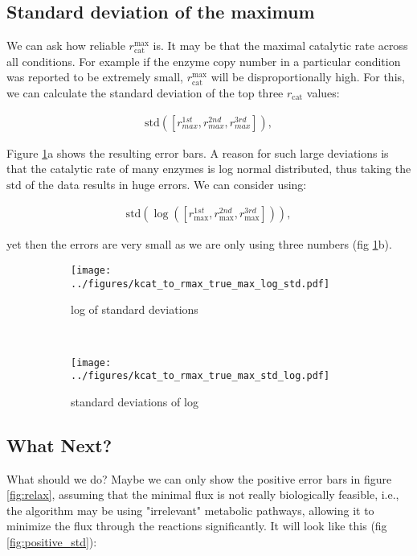 \documentclass{article}
\newcommand{\rcat}{$r_\mathrm{cat}$ }
\newcommand{\rmax}{$r_\mathrm{cat}^\mathrm{max}$ }
\begin{document}
\subsection*{Standard deviation of the maximum}

We can ask how reliable \rmax is. It may be that the maximal catalytic rate across all conditions. For example if the enzyme copy number in a particular condition was reported to be extremely small, \rmax will be disproportionally high. For this, we can calculate the standard deviation of the top three \rcat values:

\begin{align*}
\mathrm{std}([r_{max}^{1st}, r_{max}^{2nd}, r_{max}^{3rd}]),
\end{align*}

Figure \ref{fig:std}a  shows the resulting error bars. A reason for such large deviations is that the catalytic rate of many enzymes is log normal distributed, thus taking the $\mathrm{std}$ of the data results in huge errors.
We can consider using:

\begin{align*}
\mathrm{std}(\log([r_{\max}^{1st}, r_{\max}^{2nd}, r_{\max}^{3rd}])),
\end{align*}

yet then the errors are very small as we are only using three numbers (fig \ref{fig:std}b).

\begin{figure}[!htb]
        \center
        \begin{subfigure}[b]{0.4\textwidth}
                \texttt{[image: ../figures/kcat\_to\_rmax\_true\_max\_log\_std.pdf]}
                \caption{log of standard deviations}
        \end{subfigure}%
        ~ %
        \begin{subfigure}[b]{0.4\textwidth}
                \texttt{[image: ../figures/kcat\_to\_rmax\_true\_max\_std\_log.pdf]}
                \caption{standard deviations of log}
        \end{subfigure}
	\caption{}
	\label{fig:std}	
\end{figure}

\subsection*{What Next?}
What should we do? Maybe we can only show the positive error bars in figure \ref{fig:relax}, assuming that the minimal flux is not really biologically feasible, i.e., the algorithm may be using "irrelevant" metabolic pathways, allowing it to minimize the flux through the reactions significantly. It will look like this (fig \ref{fig:positive_std}):
\end{document}
